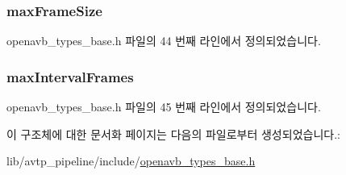 \subsubsection[{\texorpdfstring{max\+Frame\+Size}{maxFrameSize}}]{ max\+Frame\+Size}\hypertarget{struct_a_v_b_t_spec__t_ad06f76488c0370d7fcf0b26e71c07699}{}\label{struct_a_v_b_t_spec__t_ad06f76488c0370d7fcf0b26e71c07699}


openavb\+\_\+types\+\_\+base.\+h 파일의 44 번째 라인에서 정의되었습니다.

\subsubsection[{\texorpdfstring{max\+Interval\+Frames}{maxIntervalFrames}}]{ max\+Interval\+Frames}\hypertarget{struct_a_v_b_t_spec__t_aa6e25cae4ef3413612cb1acd7164d6f2}{}\label{struct_a_v_b_t_spec__t_aa6e25cae4ef3413612cb1acd7164d6f2}


openavb\+\_\+types\+\_\+base.\+h 파일의 45 번째 라인에서 정의되었습니다.



이 구조체에 대한 문서화 페이지는 다음의 파일로부터 생성되었습니다.\+:\begin{DoxyCompactItemize}
\item 
lib/avtp\+\_\+pipeline/include/\hyperlink{openavb__types__base_8h}{openavb\+\_\+types\+\_\+base.\+h}\end{DoxyCompactItemize}

